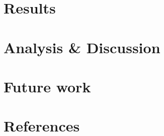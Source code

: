\documentclass[conference]{IEEEtran}
\begin{document}
\section{Results}
\section{Analysis \& Discussion}
\section{Future work}
\section{References}







\end{document}
